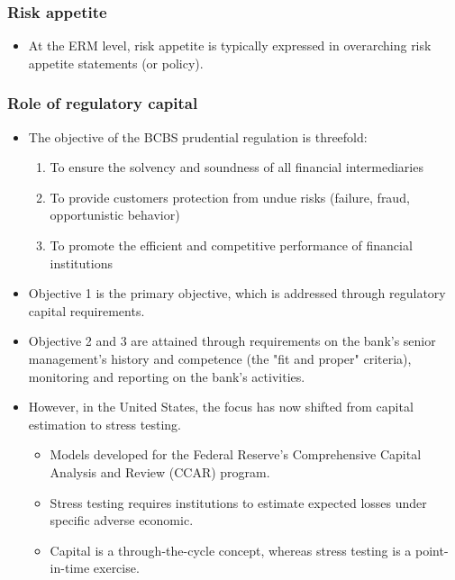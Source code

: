 \subsubsection{Risk appetite}
\begin{itemize}
\item At the ERM level, risk appetite is typically expressed in overarching risk appetite statements (or policy).
\end{itemize}


\subsubsection{Role of regulatory capital}
\begin{itemize}
\item The objective of the BCBS prudential regulation is threefold:
    \begin{enumerate}
    \item To ensure the solvency and soundness of all financial intermediaries
    \item To provide customers protection from undue risks (failure, fraud, opportunistic behavior)
    \item To promote the efficient and competitive performance of financial institutions
    \end{enumerate}
\item Objective 1 is the primary objective, which is addressed through regulatory capital requirements.
\item Objective 2 and 3 are attained through requirements on the bank's senior management's history and competence (the "fit and proper" criteria), monitoring and reporting on the bank's activities.
\item However, in the United States, the focus has now shifted from capital estimation to stress testing.
    \begin{itemize}
    \item Models developed for the Federal Reserve's Comprehensive Capital Analysis and Review (CCAR) program.
    \item Stress testing requires institutions to estimate expected losses under specific adverse economic.
    \item Capital is a through-the-cycle concept, whereas stress testing is a point-in-time exercise.
    \end{itemize}

\end{itemize}


